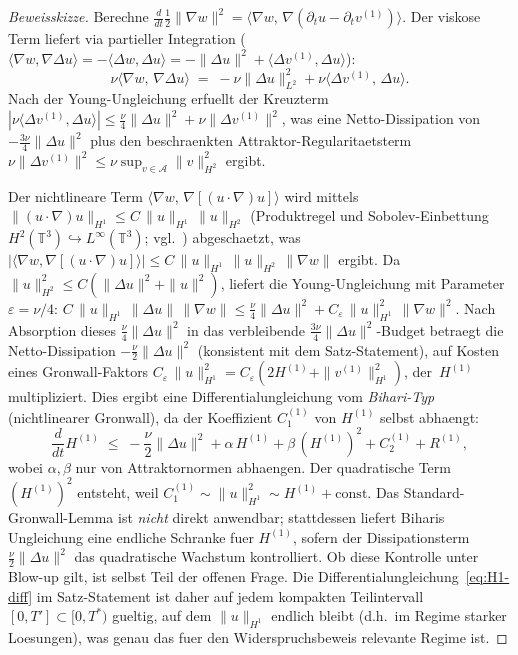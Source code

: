 \documentclass[12pt,a4paper]{article}
\theoremstyle{definition}
\theoremstyle{plain}
\theoremstyle{remark}
\begin{document}
\begin{proof}[Beweisskizze]
Berechne $\frac{d}{dt}\frac{1}{2}\|\nabla w\|^2
= \langle \nabla w,\,\nabla(\partial_t u - \partial_t v^{(1)})\rangle$.
Der viskose Term liefert via partieller Integration
($\langle \nabla w, \nabla\Delta u\rangle
= -\langle \Delta w, \Delta u\rangle
= -\|\Delta u\|^2 + \langle \Delta v^{(1)}, \Delta u\rangle$):
\[
  \nu\langle \nabla w,\, \nabla\Delta u \rangle
  \;=\; -\nu\|\Delta u\|_{L^2}^2
        + \nu\langle \Delta v^{(1)},\, \Delta u \rangle.
\]
Nach der Young-Ungleichung erfuellt der Kreuzterm
$|\nu\langle \Delta v^{(1)}, \Delta u\rangle|
\le \frac{\nu}{4}\|\Delta u\|^2 + \nu\|\Delta v^{(1)}\|^2$,
was eine Netto-Dissipation von $-\frac{3\nu}{4}\|\Delta u\|^2$
plus den beschraenkten Attraktor-Regularitaetsterm
$\nu\|\Delta v^{(1)}\|^2 \le \nu\sup_{v\in\mathcal{A}}\|v\|_{H^2}^2$ ergibt.

Der nichtlineare Term $\langle \nabla w,\, \nabla[(u\cdot\nabla)u]\rangle$
wird mittels
$\|(u\cdot\nabla)u\|_{H^1} \le C\,\|u\|_{H^1}\,\|u\|_{H^2}$
(Produktregel und Sobolev-Einbettung $H^2(\mathbb{T}^3) \hookrightarrow
L^\infty(\mathbb{T}^3)$; vgl.\ \cite{ConstantinFoias1988}) abgeschaetzt, was
$|\langle \nabla w, \nabla[(u\cdot\nabla)u]\rangle|
\le C\,\|u\|_{H^1}\,\|u\|_{H^2}\,\|\nabla w\|$ ergibt.
Da $\|u\|_{H^2}^2 \le C(\|\Delta u\|^2 + \|u\|^2)$,
liefert die Young-Ungleichung mit Parameter $\varepsilon = \nu/4$:
$C\,\|u\|_{H^1}\,\|\Delta u\|\,\|\nabla w\|
\le \frac{\nu}{4}\|\Delta u\|^2
+ C_\varepsilon\,\|u\|_{H^1}^2\,\|\nabla w\|^2$.
Nach Absorption dieses $\frac{\nu}{4}\|\Delta u\|^2$ in das verbleibende
$\frac{3\nu}{4}\|\Delta u\|^2$-Budget betraegt die Netto-Dissipation
$-\frac{\nu}{2}\|\Delta u\|^2$ (konsistent mit dem Satz-Statement),
auf Kosten eines Gronwall-Faktors
$C_\varepsilon\,\|u\|_{H^1}^2 = C_\varepsilon(2H^{(1)}
+ \|v^{(1)}\|_{H^1}^2)$, der~$H^{(1)}$ multipliziert.
Dies ergibt eine Differentialungleichung vom \emph{Bihari-Typ}
(nichtlinearer Gronwall), da der Koeffizient $C_1^{(1)}$ von
$H^{(1)}$ selbst abhaengt:
\[
  \frac{d}{dt}H^{(1)}
  \;\le\;
  -\frac{\nu}{2}\|\Delta u\|^2
  + \alpha\,H^{(1)}
  + \beta\,(H^{(1)})^2
  + C_2^{(1)}
  + R^{(1)},
\]
wobei $\alpha, \beta$ nur von Attraktornormen abhaengen.
Der quadratische Term $(H^{(1)})^2$ entsteht, weil
$C_1^{(1)} \sim \|u\|_{H^1}^2 \sim H^{(1)} + \mathrm{const}$.
Das Standard-Gronwall-Lemma ist \emph{nicht} direkt anwendbar;
stattdessen liefert Biharis Ungleichung eine endliche Schranke fuer $H^{(1)}$,
sofern der Dissipationsterm $\frac{\nu}{2}\|\Delta u\|^2$
das quadratische Wachstum kontrolliert. Ob diese Kontrolle unter Blow-up
gilt, ist selbst Teil der offenen Frage. Die
Differentialungleichung~\eqref{eq:H1-diff} im Satz-Statement ist daher
auf jedem kompakten Teilintervall $[0,T'] \subset [0,T^*)$ gueltig, auf dem
$\|u\|_{H^1}$ endlich bleibt (d.h.\ im Regime starker Loesungen), was
genau das fuer den Widerspruchsbeweis relevante Regime ist.


\end{proof}
\end{document}
